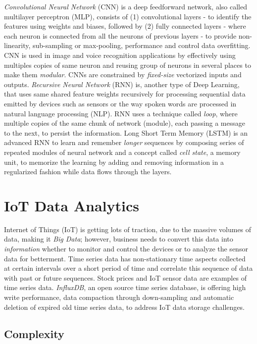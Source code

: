 \documentclass[sigconf]{acmart}
\begin{document}
	{\em Convolutional Neural Network} (CNN) is a deep feedforward network, also called multilayer perceptron (MLP), consists of (1) convolutional layers - to identify the features using weights and biases, followed by (2) fully connected layers - where each neuron is connected from all the neurons of previous layers - to provide non-linearity, sub-sampling or max-pooling, performance and control data overfitting. CNN is used in image and voice recognition applications by effectively using multiples copies of same neuron and reusing group of neurons in several places to make them {\em modular}. CNNs are constrained by {\em fixed-size} vectorized inputs and outputs. {\em Recursive Neural Network} (RNN) is, another type of Deep Learning, that uses same shared feature weights recursively for processing sequential data emitted by devices such as sensors or the way spoken words are processed in natural language processing (NLP). RNN uses a technique called {\em loop}, where multiple copies of the same chunk of network (module), each passing a message to the next, to persist the information. Long Short Term Memory (LSTM) is an advanced RNN to learn and remember {\em longer} sequences by composing series of repeated modules of neural network and a concept called {\em cell state}, a memory unit, to memorize the learning by adding and removing information in a regularized fashion while data flows through the layers.  	

	
	\section{IoT Data Analytics}
	
	Internet of Things (IoT) is getting lots of traction, due to the massive volumes of data, making it {\em Big Data}; however, business needs to convert this data into {\em information} whether to monitor and control the devices or to analyze the sensor data for betterment. Time series data has non-stationary time aspects collected at certain intervals over a short period of time and correlate this sequence of data with past or future sequences. Stock prices and IoT sensor data are examples of time series data. {\em InfluxDB}, an open source time series database, is offering high write performance, data compaction through down-sampling and automatic deletion of expired old time series data, to address IoT data storage challenges.	
	
	
	\subsection{Complexity}
	
\end{document}
